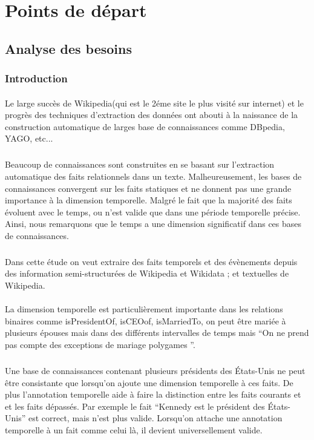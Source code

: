 \section*{Points de départ}

\subsection*{Analyse des besoins}
\subsubsection*{Introduction}
\paragraph{}
Le large succès de Wikipedia(qui est le 2éme site le plus visité sur internet) et le progrès des techniques d’extraction des données ont abouti à la naissance de la construction automatique  de larges base de connaissances comme DBpedia, YAGO, etc...
\subparagraph{}
Beaucoup de connaissances sont construites en se basant sur l’extraction automatique des faits relationnels dans un texte.
Malheureusement, les bases de connaissances convergent sur les faits statiques et ne donnent pas une grande importance à la dimension temporelle.
Malgré le fait que la majorité des faits évoluent avec le temps, ou n'est valide que dans une période temporelle précise.
Ainsi, nous remarquons que le temps a une dimension significatif dans ces bases de connaissances.
\subparagraph{}
Dans cette étude on veut extraire des faits temporels et des évènements depuis des information semi-structurées de Wikipedia et Wikidata ; et textuelles de Wikipedia.
\paragraph{}
La dimension temporelle est particulièrement importante dans les relations binaires comme isPresidentOf, isCEOof, isMarriedTo, on peut être mariée à plusieurs épouses mais dans des différents intervalles de temps mais “On ne prend pas compte des exceptions de mariage polygames ”.
\subparagraph{}
Une base de connaissances contenant plusieurs présidents des États-Unis ne peut être consistante que lorsqu’on ajoute une dimension temporelle à ces faits. De plus l’annotation temporelle aide à faire la distinction entre les faits courants et et les faits dépassés.
Par exemple le fait “Kennedy est le président des États-Unis” est correct, mais n'est plus valide.
Lorsqu’on attache une annotation temporelle à un fait comme celui là, il devient universellement valide.

